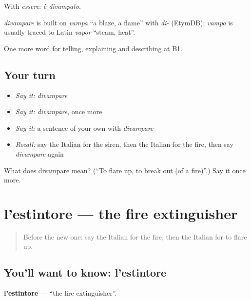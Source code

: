 With \emph{essere}: \emph{è divampato}.

\begin{cousinweb}
\emph{divampare} is built on \emph{vampa} \textquotedblleft{}a blaze, a flame\textquotedblright{} with \emph{di-} (EtymDB); \emph{vampa} is usually traced to Latin \emph{vapor} \textquotedblleft{}steam, heat\textquotedblright{}.
\end{cousinweb}

\begin{grammarlens}[title={What you've built}]
One more word for telling, explaining and describing at B1.
\end{grammarlens}

\subsection*{Your turn}
\begin{itemize}
\raggedright
  \item \emph{Say it:} \emph{divampare}
  \item \emph{Say it:} \emph{divampare}, once more
  \item \emph{Say it:} a sentence of your own with \emph{divampare}
  \item \emph{Recall:} say the Italian for the siren, then the Italian for the fire, then say \emph{divampare} again
\end{itemize}

\begin{tcolorbox}[breakable,colback=teal!4,colframe=teal!35!black,title={Before you move on}]
What does divampare mean? (\textquotedblleft{}To flare up, to break out (of a fire)\textquotedblright{}.) Say it once more.
\end{tcolorbox}
\section[l'estintore]{l'estintore — the fire extinguisher}

\label{lesson:IT-C302-estintore}



\begin{quote}
Before the new one: say the Italian for the fire, then the Italian for to flare up.
\end{quote}

\subsection*{You'll want to know: l'estintore}
\textbf{l'estintore} — \textquotedblleft{}the fire extinguisher\textquotedblright{}.

